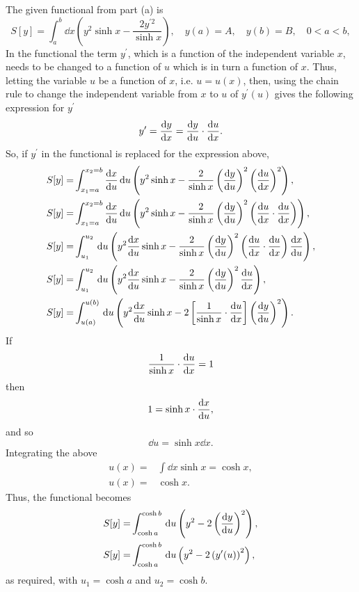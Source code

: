\def\dxu{\deriv{x}{u}}%
The given functional from part (a) is
\[
	S[y] = \int_a^b \dd x\left(y^2\sinh x -\frac{2y^{\prime 2}}{\sinh x}\right),\quad y(a) = A,\quad y(b) = B,\quad 0< a < b,
\]
In the functional the term $y^\prime$, which is a function of the independent variable $x$, needs to be changed to a function of $u$ which is in turn a function of $x$. Thus, letting the variable $u$ be a function of $x$, i.e. $u=u(x)$, then, using the chain rule to change the independent variable from $x$ to $u$ of $y^\prime(u)$ gives the following expression for $y^\prime$
\[
	y^\prime = \frac{\mathrm{d}y}{\mathrm{d}x} = \frac{\mathrm{d}y}{\mathrm{d}u}\cdot\frac{\mathrm{d}u}{\mathrm{d}x}.
\]
So, if $y^\prime$ in the functional is replaced for the expression above, 
\begin{equation*}
\begin{split}
	S[y] =& \int_{x_1=a}^{x_2=b}\deriv{x}{u}\dd u\left(y^2\sinh x-\frac{2}{\sinh x}\left(\deriv{y}{u}\right)^2\left(\deriv{u}{x}\right)^2\right),\\
	S[y] =& \int_{x_1=a}^{x_2=b}\deriv{x}{u}\dd u\left(y^2\sinh x-\frac{2}{\sinh x}\left(\deriv{y}{u}\right)^2\left(\deriv{u}{x}\cdot\deriv{u}{x}\right)\right),\\
	S[y] =& \int_{u_1}^{u_2}\dd u\left(y^2\dxu\sinh x-\frac{2}{\sinh x}\left(\deriv{y}{u}\right)^2\left(\deriv{u}{x}\cdot\deriv{u}{x}\right)\deriv{x}{u}\right),\\
	S[y] =& \int_{u_1}^{u_2}\dd u\left(y^2\dxu\sinh x-\frac{2}{\sinh x}\left(\deriv{y}{u}\right)^2\deriv{u}{x}\right),\\
	S[y] =& \int_{u(a)}^{u(b)}\dd u\left(y^2\dxu\sinh x-2\left[\frac{1}{\sinh x}\cdot\deriv{u}{x}\right]\left(\deriv{y}{u}\right)^2\right).
\end{split}
\end{equation*}
If
\[
	\frac{1}{\sinh x}\cdot\frac{\mathrm{d}u}{\mathrm{d}x} = 1
\]
then
\[
	1 = \sinh x\cdot\frac{\mathrm{d}x}{\mathrm{d}u},
\]
and so
\[
	\dd u = \sinh x \dd x.
\]
Integrating the above
\begin{equation*}
\begin{split}
	u(x) =& \int \dd x \sinh x = \cosh x,\\
	u(x) =& \cosh x.
\end{split}
\end{equation*}
Thus, the functional becomes
\begin{align}
	S[y] =& \int_{\cosh a}^{\cosh b}\, \mathrm{d} u \left(y^2 -2\left(\frac{\mathrm{d}y}{\mathrm{d}u}\right)^2\right),\nonumber\\
	\label{eq:1.1}
	S[y] =& \int_{\cosh a}^{\cosh b}\, \mathrm{d} u \left(y^2-2\left(y^\prime(u)\right)^2\right),
\end{align}
as required, with $u_1=\cosh a$ and $u_2=\cosh b$.